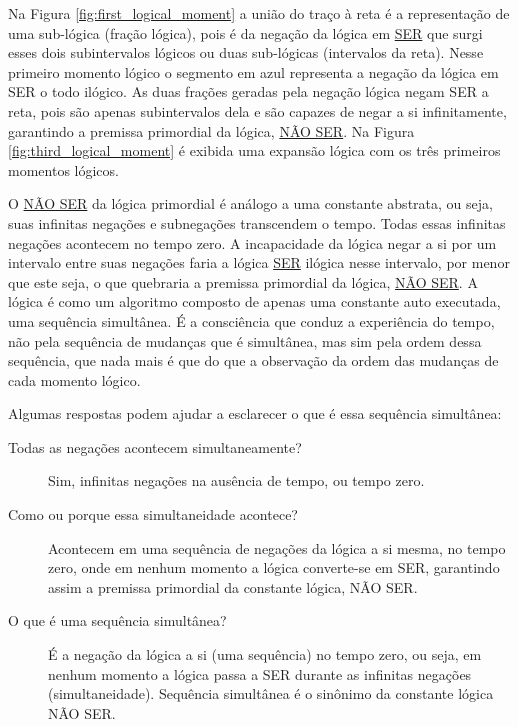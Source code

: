 Na Figura \ref{fig:first_logical_moment} a união do traço à reta é a representação de uma sub-lógica (fração lógica), pois é da negação da lógica em \underline{SER} que surgi esses dois subintervalos lógicos ou duas sub-lógicas (intervalos da reta). Nesse primeiro momento lógico o segmento em azul representa a negação da lógica em SER o todo ilógico. As duas frações geradas pela negação lógica negam SER a reta, pois são apenas subintervalos dela e são capazes de negar a si infinitamente, garantindo a premissa primordial da lógica, \underline{NÃO SER}. Na Figura \ref{fig:third_logical_moment} é exibida uma expansão lógica com os três primeiros momentos lógicos. 

O \underline{NÃO SER} da lógica primordial é análogo a uma constante abstrata, ou seja, suas infinitas negações e subnegações transcendem o tempo. Todas essas infinitas negações acontecem no tempo zero. A incapacidade da lógica negar a si por um intervalo entre suas negações faria a lógica \underline{SER} ilógica nesse intervalo, por menor que este seja, o que quebraria a premissa primordial da lógica, \underline{NÃO SER}. A lógica é como um algoritmo composto de apenas uma constante auto executada, uma sequência simultânea. É a consciência que conduz a experiência do tempo, não pela sequência de mudanças que é simultânea, mas sim pela ordem dessa sequência, que nada mais é que do que a observação da ordem das mudanças de cada momento lógico.

Algumas respostas podem ajudar a esclarecer o que é essa sequência simultânea:
	\begin{description}
	   \item[Todas as negações acontecem simultaneamente?] Sim, infinitas negações na ausência de tempo, ou tempo zero.
	   \item[Como ou porque essa simultaneidade acontece?] Acontecem em uma sequência de negações da lógica a si mesma, no tempo zero, onde em nenhum momento a lógica converte-se em SER, garantindo assim a premissa primordial da constante lógica, NÃO SER.
	   \item[O que é uma sequência simultânea?] É a negação da lógica a si (uma sequência) no tempo zero, ou seja, em nenhum momento a lógica passa a SER durante as infinitas negações (simultaneidade). Sequência simultânea é o sinônimo da constante lógica NÃO SER.
	\end{description}


